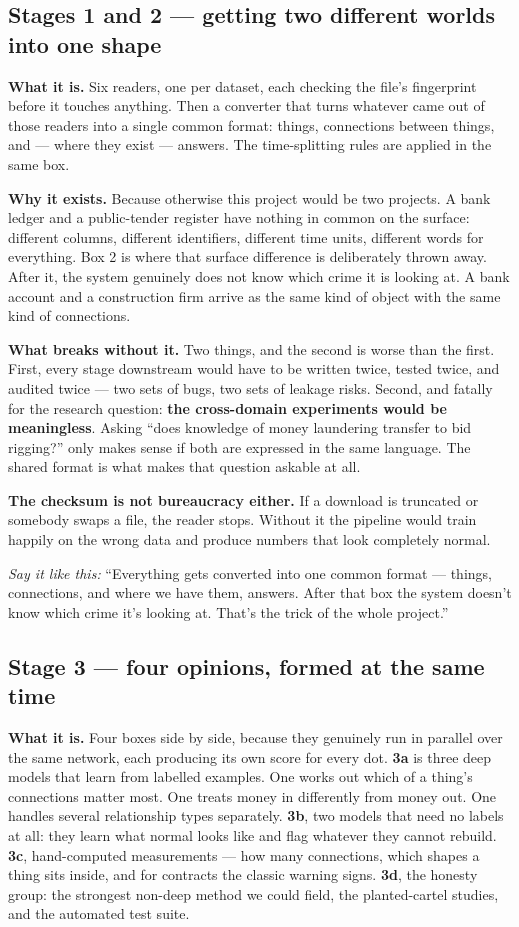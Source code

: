 \documentclass[11pt,a4paper]{article}
\newcommand{\aloud}[1]{\par\smallskip\noindent\textit{\textcolor{accent}{Say
it like this:}} ``#1''\par\smallskip}
\begin{document}
\subsection{Stages 1 and 2 --- getting two different worlds into one shape}

\textbf{What it is.} Six readers, one per dataset, each checking the file's
fingerprint before it touches anything. Then a converter that turns whatever
came out of those readers into a single common format: things, connections
between things, and --- where they exist --- answers. The time-splitting rules
are applied in the same box.

\textbf{Why it exists.} Because otherwise this project would be two projects. A
bank ledger and a public-tender register have nothing in common on the surface:
different columns, different identifiers, different time units, different words
for everything. Box 2 is where that surface difference is deliberately thrown
away. After it, the system genuinely does not know which crime it is looking
at. A bank account and a construction firm arrive as the same kind of object
with the same kind of connections.

\textbf{What breaks without it.} Two things, and the second is worse than the
first. First, every stage downstream would have to be written twice, tested
twice, and audited twice --- two sets of bugs, two sets of leakage risks.
Second, and fatally for the research question: \textbf{the cross-domain
experiments would be meaningless}. Asking ``does knowledge of money laundering
transfer to bid rigging?'' only makes sense if both are expressed in the same
language. The shared format is what makes that question askable at all.

\textbf{The checksum is not bureaucracy either.} If a download is truncated or
somebody swaps a file, the reader stops. Without it the pipeline would train
happily on the wrong data and produce numbers that look completely normal.

\aloud{Everything gets converted into one common format --- things,
connections, and where we have them, answers. After that box the system doesn't
know which crime it's looking at. That's the trick of the whole project.}

\subsection{Stage 3 --- four opinions, formed at the same time}

\textbf{What it is.} Four boxes side by side, because they genuinely run in
parallel over the same network, each producing its own score for every dot.
\textbf{3a} is three deep models that learn from labelled examples. One works
out which of a thing's connections matter most. One treats money in differently
from money out. One handles several relationship types separately.
\textbf{3b}, two models that need no labels at all: they learn what
normal looks like and flag whatever they cannot rebuild. \textbf{3c},
hand-computed measurements --- how many connections, which shapes a thing sits
inside, and for contracts the classic warning signs. \textbf{3d}, the honesty
group: the strongest non-deep method we could field, the planted-cartel
studies, and the automated test suite.
\end{document}
